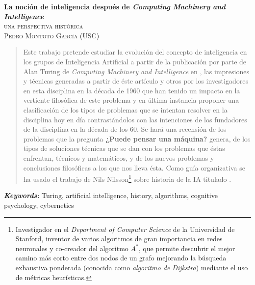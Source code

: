 \documentclass[12pt]{memoir}
\makeatletter
\newlength\drop
\newcommand*\titleM{\begingroup%
\setlength\drop{0.08\textheight}
\centering
\vspace*{\drop}
{\Huge\bfseries La noción de inteligencia después de \textit{Computing Machinery and Intelligence}}\\[\baselineskip]
{\scshape una perspectiva histórica}\\[\baselineskip]
\vfill
{\large\scshape Pedro Montoto García (USC)}\par
\vfill
{\scshape \@date}\par
\vspace*{2\drop}
\endgroup}
\providecommand{\keywords}[1]{\textbf{\textit{Keywords: }} #1}
\makeatother
\begin{document}
\pagestyle{empty}




\begin{titlingpage}
\titleM
\end{titlingpage}




\pagestyle{fancy}
\fancyhf{}
\lhead[]{\thepage}
\rhead[\thepage]{}


\thispagestyle{empty}
\begin{abstract}
	Este trabajo pretende estudiar la evolución del concepto de inteligencia en los grupos de Inteligencia Artificial a partir de la publicación por parte de Alan Turing de \textit{Computing Machinery and Intelligence} en \cite{Turing1950cmi}, las impresiones y técnicas generadas a partir de éste artículo y otros por los investigadores en esta disciplina en la década de 1960 que han tenido un impacto en la vertiente filosófica de este problema y en última instancia proponer una clasificación de los tipos de problemas que se intentan resolver en la disciplina hoy en día contrastándolos con las intenciones de los fundadores de la disciplina en la década de los 60. Se hará una recensión de los problemas que la pregunta \textbf{¿Puede pensar una máquina?} genera, de los tipos de soluciones técnicas que se dan con los problemas que éstas enfrentan, técnicos y matemáticos, y de los nuevos problemas y conclusiones filosóficas a los que nos lleva ésta. Como guía organizativa se ha usado el trabajo de Nils Nilsson\footnote{Investigador en el \textit{Department of Computer Science} de la Universidad de Stanford, inventor de varios algoritmos de gran importancia en redes neuronales y co-creador del algoritmo $A^*$, que permite descubrir el mejor camino más corto entre dos nodos de un grafo mejorando la búsqueda exhaustiva ponderada (conocida como \textit{algoritmo de Dijkstra}) mediante el uso de métricas heurísticas.} \parencite{Nilsson2009} sobre historia de la IA titulado .
\end{abstract}
\keywords{Turing, artificial intelligence, history, algorithms, cognitive psychology, cybernetics}
\end{document}
